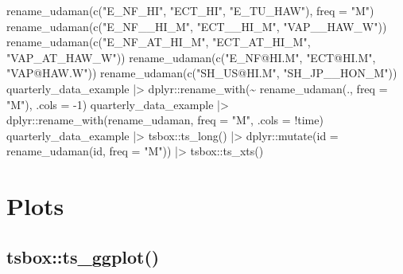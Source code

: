 \documentclass[
  letterpaper,
  DIV=11,
  numbers=noendperiod]{scrreport}
\newenvironment{Shaded}{\begin{snugshade}}{\end{snugshade}}
\newcommand{\AttributeTok}[1]{\textcolor[rgb]{0.40,0.45,0.13}{#1}}
\newcommand{\DecValTok}[1]{\textcolor[rgb]{0.68,0.00,0.00}{#1}}
\newcommand{\FunctionTok}[1]{\textcolor[rgb]{0.28,0.35,0.67}{#1}}
\newcommand{\NormalTok}[1]{\textcolor[rgb]{0.00,0.23,0.31}{#1}}
\newcommand{\SpecialCharTok}[1]{\textcolor[rgb]{0.37,0.37,0.37}{#1}}
\newcommand{\StringTok}[1]{\textcolor[rgb]{0.13,0.47,0.30}{#1}}
\begin{document}
\begin{Shaded}
\begin{Highlighting}[]
\FunctionTok{rename\_udaman}\NormalTok{(}\FunctionTok{c}\NormalTok{(}\StringTok{"E\_NF\_HI"}\NormalTok{, }\StringTok{"ECT\_HI"}\NormalTok{, }\StringTok{"E\_TU\_HAW"}\NormalTok{), }\AttributeTok{freq =} \StringTok{"M"}\NormalTok{)}
\FunctionTok{rename\_udaman}\NormalTok{(}\FunctionTok{c}\NormalTok{(}\StringTok{"E\_NF\_\_HI\_M"}\NormalTok{, }\StringTok{"ECT\_\_HI\_M"}\NormalTok{, }\StringTok{"VAP\_\_HAW\_W"}\NormalTok{))}
\FunctionTok{rename\_udaman}\NormalTok{(}\FunctionTok{c}\NormalTok{(}\StringTok{"E\_NF\_AT\_HI\_M"}\NormalTok{, }\StringTok{"ECT\_AT\_HI\_M"}\NormalTok{, }\StringTok{"VAP\_AT\_HAW\_W"}\NormalTok{))}
\FunctionTok{rename\_udaman}\NormalTok{(}\FunctionTok{c}\NormalTok{(}\StringTok{"E\_NF@HI.M"}\NormalTok{, }\StringTok{"ECT@HI.M"}\NormalTok{, }\StringTok{"VAP@HAW.W"}\NormalTok{))}
\FunctionTok{rename\_udaman}\NormalTok{(}\FunctionTok{c}\NormalTok{(}\StringTok{"SH\_US@HI.M"}\NormalTok{, }\StringTok{"SH\_JP\_\_HON\_M"}\NormalTok{))}
\NormalTok{quarterly\_data\_example }\SpecialCharTok{|\textgreater{}}\NormalTok{ dplyr}\SpecialCharTok{::}\FunctionTok{rename\_with}\NormalTok{(}\SpecialCharTok{\textasciitilde{}} \FunctionTok{rename\_udaman}\NormalTok{(., }\AttributeTok{freq =} \StringTok{"M"}\NormalTok{), }\AttributeTok{.cols =} \SpecialCharTok{{-}}\DecValTok{1}\NormalTok{)}
\NormalTok{quarterly\_data\_example }\SpecialCharTok{|\textgreater{}}\NormalTok{ dplyr}\SpecialCharTok{::}\FunctionTok{rename\_with}\NormalTok{(rename\_udaman, }\AttributeTok{freq =} \StringTok{"M"}\NormalTok{, }\AttributeTok{.cols =} \SpecialCharTok{!}\NormalTok{time)}
\NormalTok{quarterly\_data\_example }\SpecialCharTok{|\textgreater{}}
\NormalTok{  tsbox}\SpecialCharTok{::}\FunctionTok{ts\_long}\NormalTok{() }\SpecialCharTok{|\textgreater{}}
\NormalTok{  dplyr}\SpecialCharTok{::}\FunctionTok{mutate}\NormalTok{(}\AttributeTok{id =} \FunctionTok{rename\_udaman}\NormalTok{(id, }\AttributeTok{freq =} \StringTok{"M"}\NormalTok{)) }\SpecialCharTok{|\textgreater{}}
\NormalTok{  tsbox}\SpecialCharTok{::}\FunctionTok{ts\_xts}\NormalTok{()}
\end{Highlighting}
\end{Shaded}

\section{Plots}\label{sec-plots}

\subsection{tsbox::ts\_ggplot()}\label{tsboxts_ggplot}
\end{document}
